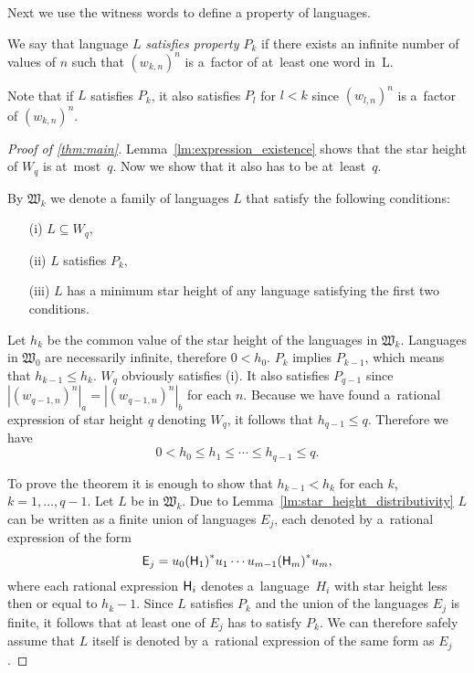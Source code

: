 Next we use the witness words to define a property of languages.

\begin{defn}
    We say that language $L$ \emph{satisfies property $P_k$} if there exists an infinite number of values of $n$ such that ${(w_{k,n})}^n$ is a~factor of at~least one word in~L.
\end{defn}

Note that if $L$ satisfies $P_k$, it also satisfies $P_l$ for $l < k$ since ${(w_{l,n})}^n$ is a~factor of ${(w_{k,n})}^n$.

\begin{proof}[Proof of \autoref*{thm:main}]
    Lemma~\ref*{lm:expression_existence} shows that the star height of $W_q$ is at~most~$q$. Now we show that it also has to be at~least~$q$.

    By $\mathfrak{W}_k$ we denote a family of languages $L$ that satisfy the following conditions:
    \begin{itemize}
        \item[(i)] $L \subseteq W_q$,
        \item[(ii)] $L$ satisfies $P_k$,
        \item[(iii)] $L$ has a minimum star height of any language satisfying the first two conditions.
    \end{itemize}

    Let $h_k$ be the common value of the star height of the languages in $\mathfrak{W}_k$. Languages in $\mathfrak{W}_0$ are necessarily infinite, therefore $0 < h_0$. $P_k$ implies $P_{k-1}$, which means that $h_{k-1} \leq h_k$. $W_q$ obviously satisfies (i). It also satisfies $P_{q-1}$ since $|{(w_{q-1,n})}^n|_a = |{(w_{q-1,n})}^n|_b$ for each $n$. Because we have found a~rational expression of star height $q$ denoting $W_q$, it follows that $h_{q-1} \leq q$. Therefore we have
    \[
        0 < h_0 \leq h_1 \leq \dotsb \leq h_{q-1} \leq q.
    \]

    To prove the theorem it is enough to show that $h_{k-1} < h_k$ for each $k$, $k=1, \dotsc, q-1$. Let $L$ be in $\mathfrak{W}_k$. Due to Lemma~\ref*{lm:star_height_distributivity} $L$ can be written as a finite union of languages $E_j$, each denoted by a~rational expression of the form
    \[
        {\mathsf{E}}_j = u_0{({\mathsf{H}}_1)}^*u_1 \dotsm u_{m-1}{({\mathsf{H}}_m)}^*u_m,
    \]
    where each rational expression ${\mathsf{H}}_i$ denotes a~language~$H_i$ with star height less then or equal to $h_k-1$. Since $L$ satisfies $P_k$ and the union of the languages $E_j$ is finite, it follows that at least one of $E_j$ has to satisfy $P_k$. We can therefore safely assume that $L$ itself is denoted by a~rational expression of the same form as $E_j$.


\end{proof}
